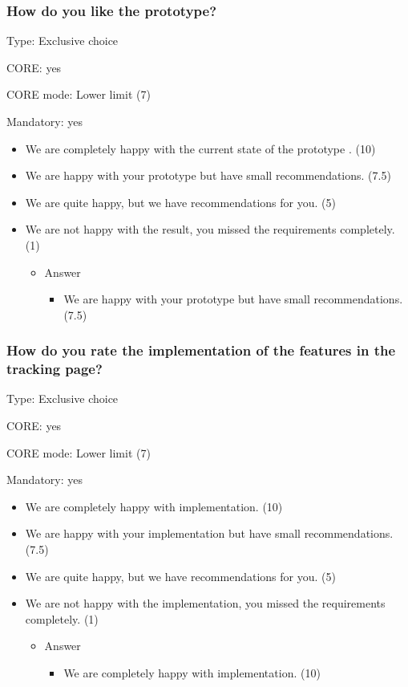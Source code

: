 \subsubsection{How do you like the prototype?}
\label{sec:org9e85fe0}
Type: Exclusive choice 

CORE: yes

CORE mode: Lower limit (7) 

Mandatory: yes 

\begin{itemize}
	\item We are completely happy with the current state of the prototype . (10)
	\item We are happy with your prototype but have small recommendations. (7.5)
	\item We are quite happy, but we have recommendations for you. (5)
	\item We are not happy with the result, you missed the requirements completely. (1)
	
	\begin{itemize}
		\item Answer
			\begin{itemize}
				\item	We are happy with your prototype but have small recommendations. (7.5)
			\end{itemize}
	\end{itemize}

\end{itemize}


\subsubsection{How do you rate the implementation of the features in the tracking page?}
\label{sec:org6df4067}

Type: Exclusive choice 

CORE: yes

CORE mode: Lower limit (7) 

Mandatory: yes 

\begin{itemize}
	\item We are completely happy with implementation. (10) 
	\item We are happy with your implementation but have small recommendations. (7.5) 
	\item We are quite happy, but we have recommendations for you. (5) 
	\item We are not happy with the implementation, you missed the requirements completely. (1) 
	
	\begin{itemize}
		\item Answer
		\begin{itemize}
			\item We are completely happy with implementation. (10) 
		\end{itemize}
	\end{itemize}
\end{itemize}


